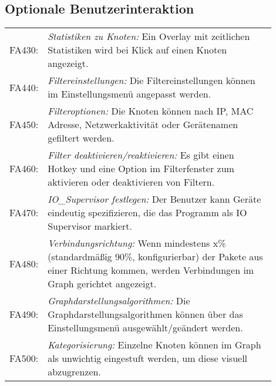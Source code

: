 \subsection{Optionale Benutzerinteraktion}

\begin{tabular}{lp{0.9\linewidth}}

FA430: & \textit{Statistiken zu Knoten: }Ein Overlay mit zeitlichen Statistiken wird bei Klick auf einen Knoten angezeigt. \\

FA440: & \textit{Filtereinstellungen: }Die Filtereinstellungen können im Einstellungsmenü angepasst werden. \\

FA450: & \textit{Filteroptionen: }Die Knoten können nach IP, MAC Adresse, Netzwerkaktivität oder Gerätenamen gefiltert werden. \\

FA460: & \textit{Filter deaktivieren/reaktivieren: }Es gibt einen Hotkey und eine Option im Filterfenster zum aktivieren oder deaktivieren von Filtern. \\

FA470: & \textit{IO\_Supervisor festlegen: }Der Benutzer kann Geräte eindeutig spezifizieren, die das Programm als IO Supervisor markiert. \\ %

FA480: & \textit{Verbindungsrichtung: }Wenn mindestens x\% (standardmäßig 90\%, konfigurierbar) der Pakete aus einer Richtung kommen, werden Verbindungen im Graph gerichtet angezeigt. \\

FA490: & \textit{Graphdarstellungsalgorithmen: }Die Graphdarstellungsalgorithmen können über das Einstellungsmenü ausgewählt/geändert werden. \\

FA500: & \textit{Kategorisierung: }Einzelne Knoten können im Graph als unwichtig eingestuft werden, um diese visuell abzugrenzen. \\
\end{tabular} 
